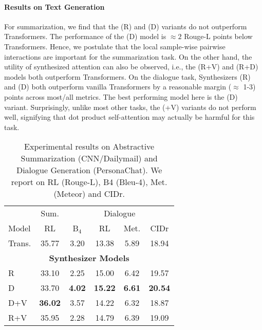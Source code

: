 \documentclass{article}
\begin{document}
\paragraph{Results on Text Generation} 
For summarization, we find that the (R) and (D) variants do not outperform Transformers. The performance of the (D) model is $\approx 2$ Rouge-L points below Transformers. Hence, we postulate that the local sample-wise pairwise interactions are important for the summarization task. On the other hand, the utility of synthesized attention can also be observed, i.e., the (R+V) and (R+D) models both outperform Transformers. On the dialogue task, Synthesizers (R) and (D) both outperform vanilla Transformers by a reasonable margin ($\approx$ 1-3) points across most/all metrics. The best performing model here is the (D) variant. Surprisingly, unlike most other tasks, the (+V) variants do not perform well, signifying that dot product self-attention may actually be harmful for this task.

\begin{table}[H]
\small
    \centering
    \begin{tabular}{l|c|cccc}
    \toprule
    & \multicolumn{1}{c}{Sum.} & \multicolumn{4}{c}{Dialogue} \\
        Model &	 RL & B$_4$ & RL & Met. & CIDr \\
        \midrule
Trans. &35.77 & 3.20 & 13.38 & 5.89 & 18.94  \\
\midrule
\multicolumn{6}{c}{\textbf{Synthesizer Models}} \\ 
\midrule
R & 33.10 & 2.25 & 15.00 & 6.42 & 19.57  \\
D	&  33.70  & \textbf{4.02} & \textbf{15.22} & \textbf{6.61} & \textbf{20.54}  \\
D+V &  \textbf{36.02} & 3.57 &  14.22 & 6.32 & 18.87  \\ 
R+V &	 	35.95 & 2.28 & 14.79 & 6.39& 19.09  \\
\bottomrule
    \end{tabular}
    \caption{Experimental results on Abstractive Summarization (CNN/Dailymail) and Dialogue Generation (PersonaChat). We report on RL (Rouge-L), B4 (Bleu-4), Met. (Meteor) and CIDr. }
    \label{tab:gen}
\end{table}
\end{document}
